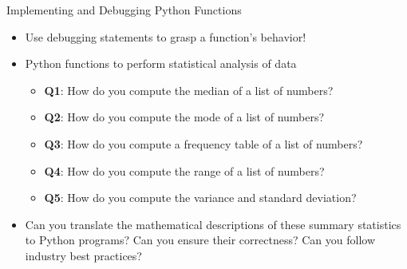 \documentclass[14pt,aspectratio=169]{beamer}
\begin{document}
%
\begin{frame}{Implementing and Debugging Python Functions}
  \begin{itemize}
    \item Use debugging statements to grasp a function's behavior!
      \vspace*{-.15in}
    \item Python functions to perform statistical analysis of data
      \begin{itemize}
        \item {\bf Q1}: How do you compute the median of a list of numbers?
        \item {\bf Q2}: How do you compute the mode of a list of numbers?
        \item {\bf Q3}: How do you compute a frequency table of a list of
          numbers?
        \item {\bf Q4}: How do you compute the range of a list of numbers?
        \item {\bf Q5}: How do you compute the variance and standard deviation?
      \end{itemize}
      \vspace*{-.2in}
    \item Can you translate the mathematical descriptions of these summary
      statistics to Python programs? Can you ensure their correctness? Can you
      follow industry best practices?
  \end{itemize}
\end{frame}
\end{document}
